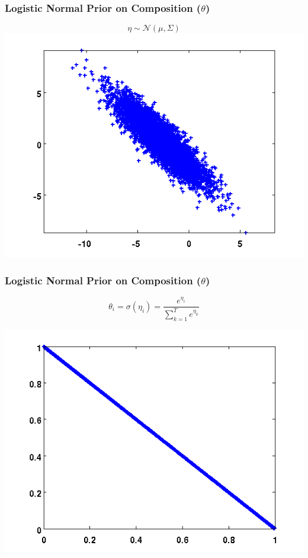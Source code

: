 \begin{frame}
  \frametitle{Logistic Normal Prior on Composition ($\theta$)}
  \begin{center}
    \vspace{-0.4in}
    \begin{equation*}
      \eta \sim \mathcal{N}(\mu, \Sigma)
    \end{equation*}
    \includegraphics[scale=0.6]{img/log-normal-figs/normal-2.png}
  \end{center}
\end{frame}

\begin{frame}
  \frametitle{Logistic Normal Prior on Composition ($\theta$)}
  \begin{center}
    \vspace{-0.3in}
    \begin{equation*}
      \theta_i = \sigma(\eta_i) = \frac{e^{\eta_i}}{\sum_{k=1}^{T}e^{\eta_k}}
    \end{equation*}

    \includegraphics[scale=0.5]{img/log-normal-figs/log-normal-2.png}
  \end{center}
\end{frame}

